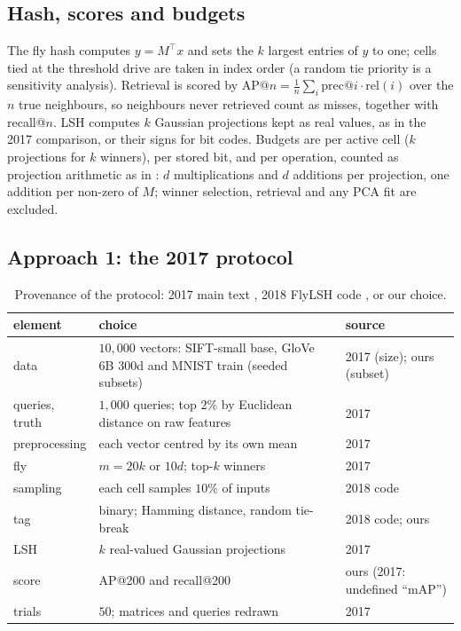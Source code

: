 \documentclass[conference]{IEEEtran}
\begin{document}
\subsection{Hash, scores and budgets}

The fly hash computes $y=M^\top x$ and sets the $k$ largest entries of $y$ to
one; cells tied at the threshold drive are taken in index order (a random
tie priority is a sensitivity analysis). Retrieval is scored by $\mathrm{AP@}n=\frac1n\sum_i
\mathrm{prec@}i\cdot\mathrm{rel}(i)$ over the $n$ true neighbours, so neighbours
never retrieved count as misses, together with recall@$n$. LSH computes $k$
Gaussian projections kept as real values, as in the 2017 comparison, or their
signs for bit codes. Budgets are per active cell ($k$ projections for $k$
winners), per stored bit, and per operation, counted as projection arithmetic
as in \cite{dasgupta2017}: $d$ multiplications and $d$ additions per
projection, one addition per non-zero of $M$; winner selection, retrieval and
any PCA fit are excluded.

\subsection{Approach 1: the 2017 protocol}

\begin{table}[t]
\caption{Provenance of the protocol: 2017 main text \cite{dasgupta2017},
2018 FlyLSH code \cite{sharma2018}, or our choice.}
\label{tab:prov}
\centering
\scriptsize
\setlength{\tabcolsep}{3pt}
\begin{tabular}{p{1.7cm}p{3.9cm}p{2.0cm}}
\toprule
element & choice & source \\
\midrule
data & $10{,}000$ vectors: SIFT-small base, GloVe 6B 300d and MNIST train (seeded subsets) & 2017 (size); ours (subset) \\
queries, truth & $1{,}000$ queries; top $2\%$ by Euclidean distance on raw features & 2017 \\
preprocessing & each vector centred by its own mean & 2017 \\
fly & $m=20k$ or $10d$; top-$k$ winners & 2017 \\
sampling & each cell samples $10\%$ of inputs & 2018 code \\
tag & binary; Hamming distance, random tie-break & 2018 code; ours \\
LSH & $k$ real-valued Gaussian projections & 2017 \\
score & AP@200 and recall@200 & ours (2017: undefined ``mAP'') \\
trials & $50$; matrices and queries redrawn & 2017 \\
\bottomrule
\end{tabular}
\end{table}
\end{document}
